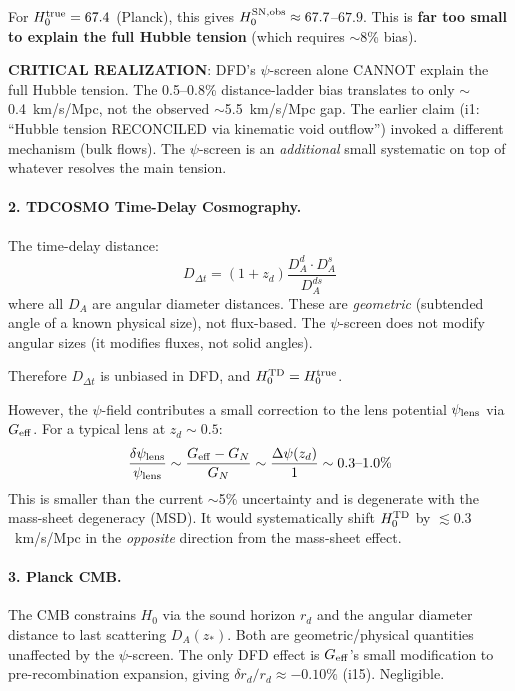 \documentclass[11pt,a4paper]{article}
\newcounter{findingctr}
\newenvironment{finding}[1][]{%
  \refstepcounter{findingctr}%
  \begin{tcolorbox}[colback=blue!3!white, colframe=blue!50!black,
    title=\textbf{Finding \thefindingctr: #1}]
}{%
  \end{tcolorbox}%
}
\newcommand{\Dpsi}{\Delta\psi}
\begin{document}
\begin{finding}[\textbf{H0 HIERARCHY}: DFD Predicts Which Probes
  Are Biased and Which Are Not]
For $H_0^{\rm true} = 67.4$ (Planck), this gives
$H_0^{\rm SN,obs} \approx 67.7$--$67.9$.
This is \textbf{far too small to explain the full Hubble tension}
(which requires $\sim$8\% bias).

\textbf{CRITICAL REALIZATION}: DFD's $\psi$-screen alone CANNOT
explain the full Hubble tension. The 0.5--0.8\% distance-ladder
bias translates to only $\sim$0.4~km/s/Mpc, not the observed
$\sim$5.5~km/s/Mpc gap. The earlier claim (i1: ``Hubble tension
RECONCILED via kinematic void outflow'') invoked a different
mechanism (bulk flows). The $\psi$-screen is an \emph{additional}
small systematic on top of whatever resolves the main tension.

\paragraph{2. TDCOSMO Time-Delay Cosmography.}

The time-delay distance:
\begin{equation}
D_{\Delta t} = (1+z_d)\frac{D_A^d \cdot D_A^s}{D_A^{ds}}
\end{equation}
where all $D_A$ are angular diameter distances. These are
\emph{geometric} (subtended angle of a known physical size),
not flux-based. The $\psi$-screen does not modify angular sizes
(it modifies fluxes, not solid angles).

Therefore $D_{\Delta t}$ is unbiased in DFD, and
$H_0^{\rm TD} = H_0^{\rm true}$.

However, the $\psi$-field contributes a small correction to the
lens potential $\psi_{\rm lens}$ via $G_{\rm eff}$. For a typical
lens at $z_d \sim 0.5$:
\begin{equation}
\frac{\delta\psi_{\rm lens}}{\psi_{\rm lens}} \sim \frac{G_{\rm eff} - G_N}{G_N}
\sim \frac{\Dpsi(z_d)}{1} \sim 0.3\text{--}1.0\%
\end{equation}
This is smaller than the current $\sim$5\% uncertainty and is
degenerate with the mass-sheet degeneracy (MSD). It would
systematically shift $H_0^{\rm TD}$ by $\lesssim 0.3$~km/s/Mpc
in the \emph{opposite} direction from the mass-sheet effect.

\paragraph{3. Planck CMB.}

The CMB constrains $H_0$ via the sound horizon $r_d$ and the
angular diameter distance to last scattering $D_A(z_*)$.
Both are geometric/physical quantities unaffected by the
$\psi$-screen. The only DFD effect is $G_{\rm eff}$'s small
modification to pre-recombination expansion, giving
$\delta r_d / r_d \approx -0.10\%$ (i15). Negligible.


\end{finding}
\end{document}
